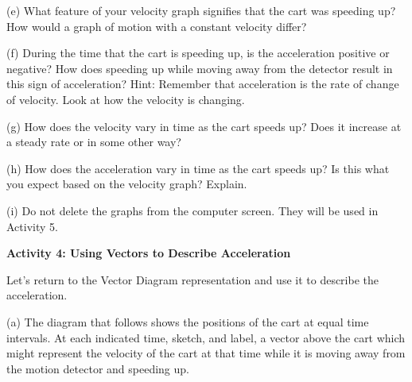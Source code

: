 (e) What feature of your velocity graph signifies that the cart was speeding
up? How would a graph of motion with a constant velocity differ? 
\vspace{13mm}

(f) During the time that the cart is speeding up, is the acceleration positive
or negative? How does speeding up while moving away from the detector result
in this sign of acceleration? Hint: Remember that acceleration is the rate of
change of velocity. Look at how the velocity is changing. 
\vspace{13mm}

(g) How does the velocity vary in time as the cart speeds up? Does it increase
at a steady rate or in some other way? 
\vspace{13mm}

(h) How does the acceleration vary in time as the cart speeds up? Is this what
you expect based on the velocity graph? Explain.
\vspace{13mm}

(i) Do not delete the graphs from the computer screen.  They will be used in Activity 5.
\vspace{10mm}

\textbf{Activity 4: Using Vectors to Describe Acceleration} 

Let's return to the Vector Diagram representation and use it to describe the
acceleration.

(a) The diagram that follows shows the positions of the cart at equal time intervals.
At each indicated time, sketch, and label, a vector above the cart which might represent
the velocity of the cart at that time while it is moving away from the motion
detector and speeding up.

